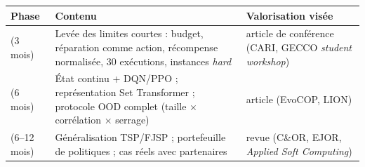 \documentclass[
  french,
  11pt,
  a4paper,
]{article}
\newcounter{none} %
\begin{document}
{\def\LTcaptype{none} %
\begin{longtable}[]{@{}
  >{\raggedright\arraybackslash}p{}
  >{\raggedright\arraybackslash}p{}
  >{\raggedright\arraybackslash}p{}@{}}
\toprule\noalign{}
\begin{minipage}[b]{\linewidth}\raggedright
Phase
\end{minipage} & \begin{minipage}[b]{\linewidth}\raggedright
Contenu
\end{minipage} & \begin{minipage}[b]{\linewidth}\raggedright
Valorisation visée
\end{minipage} \\
\midrule\noalign{}
\endhead
\bottomrule\noalign{}
\endlastfoot
1 (3 mois) & Levée des limites courtes : budget, réparation comme
action, récompense normalisée, 30 exécutions, instances \emph{hard} &
article de conférence (CARI, GECCO \emph{student workshop}) \\
2 (6 mois) & État continu + DQN/PPO ; représentation Set Transformer ;
protocole OOD complet (taille × corrélation × serrage) & article
(EvoCOP, LION) \\
3 (6--12 mois) & Généralisation TSP/FJSP ; portefeuille de politiques ;
cas réels avec partenaires & revue (C\&OR, EJOR, \emph{Applied Soft
Computing}) \\
\end{longtable}
}

\printbibliography[title=Bibliographie]
\end{document}
